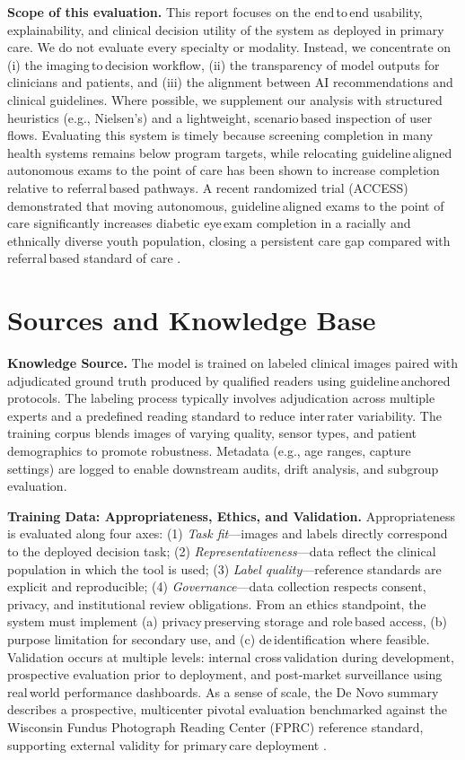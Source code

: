 \documentclass[sigplan,screen]{acmart}
\begin{document}
\textbf{Scope of this evaluation.} This report focuses on the end\,to\,end usability, explainability, and clinical decision utility of the system as deployed in primary care. We do not evaluate every specialty or modality. Instead, we concentrate on (i) the imaging\,to\,decision workflow, (ii) the transparency of model outputs for clinicians and patients, and (iii) the alignment between AI recommendations and clinical guidelines. Where possible, we supplement our analysis with structured heuristics (e.g., Nielsen’s) and a lightweight, scenario\,based inspection of user flows\cite{fda2018denovo_summary}. Evaluating this system is timely because screening completion in many health systems remains below program targets, while relocating guideline\,aligned autonomous exams to the point of care has been shown to increase completion relative to referral\,based pathways. A recent randomized trial (ACCESS) demonstrated that moving autonomous, guideline\,aligned exams to the point of care significantly increases diabetic eye\,exam completion in a racially and ethnically diverse youth population, closing a persistent care gap compared with referral\,based standard of care \cite{wolf2024autonomous,fda2018denovo_summary}.

\section{Sources and Knowledge Base}
\textbf{Knowledge Source.} The model is trained on labeled clinical images paired with adjudicated ground truth produced by qualified readers using guideline\,anchored protocols. The labeling process typically involves adjudication across multiple experts and a predefined reading standard to reduce inter\,rater variability. The training corpus blends images of varying quality, sensor types, and patient demographics to promote robustness. Metadata (e.g., age ranges, capture settings) are logged to enable downstream audits, drift analysis, and subgroup evaluation\cite{abramoff2018pivotal}.

\textbf{Training Data: Appropriateness, Ethics, and Validation.} Appropriateness is evaluated along four axes: (1) \emph{Task fit}—images and labels directly correspond to the deployed decision task; (2) \emph{Representativeness}—data reflect the clinical population in which the tool is used; (3) \emph{Label quality}—reference standards are explicit and reproducible; (4) \emph{Governance}—data collection respects consent, privacy, and institutional review obligations. From an ethics standpoint, the system must implement (a) privacy\,preserving storage and role\,based access, (b) purpose limitation for secondary use, and (c) de\,identification where feasible. Validation occurs at multiple levels: internal cross\,validation during development, prospective evaluation prior to deployment, and post-market surveillance using real\,world performance dashboards\cite{abramoff2018pivotal}. As a sense of scale, the De Novo summary describes a prospective, multicenter pivotal evaluation benchmarked against the Wisconsin Fundus Photograph Reading Center (FPRC) reference standard, supporting external validity for primary\,care deployment \cite{fda2018denovo_summary,abramoff2018pivotal}.
\end{document}
